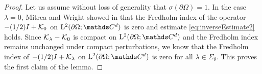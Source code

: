 \begin{proof}
  Let us assume without loss of generality that $\sigma( \partial\Omega ) = 1$.
  In the case $\lambda = 0$, Mitrea and Wright showed in \cite[Eq.\@~(5.166)]{mitreaWright} that the Fredholm index of the operator $-(1/2)I + \mathcal{K}_0$ on $\Ell^2(\partial\Omega; \C^d)$ is zero and estimate \eqref{eq:inverseEstimate2} holds.
  Since $\mathcal{K}_\lambda - \mathcal{K}_0$ is compact on $\Ell^2(\partial\Omega; \C^d)$ and the Fredholm index remains unchanged under compact perturbations, we know that the Fredholm index of $-(1/2)I + \mathcal{K}_\lambda$ on $\Ell^2(\partial\Omega; \C^d)$ is zero for all $\lambda \in \Sigma_\theta$.
  This proves the first claim of the lemma.


\end{proof}
